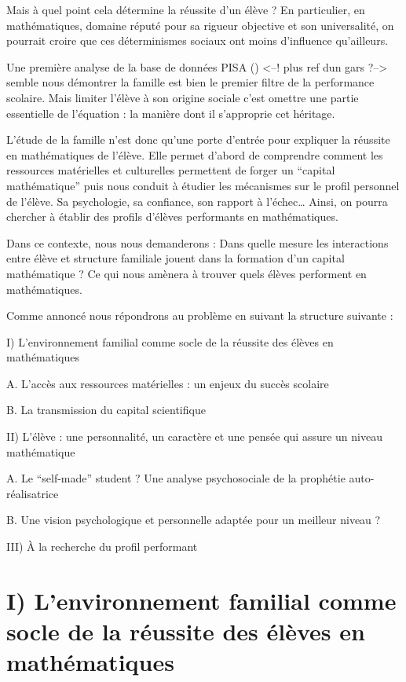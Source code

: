 \documentclass[
  french,
  11pt,
  a4paper,
]{report}
\begin{document}
Mais à quel point cela détermine la réussite d'un élève ? En
particulier, en mathématiques, domaine réputé pour sa rigueur objective
et son universalité, on pourrait croire que ces déterminismes sociaux
ont moins d'influence qu'ailleurs.

Une première analyse de la base de données PISA () \textless--! plus ref
dun gars ?--\textgreater{} semble nous démontrer la famille est bien le
premier filtre de la performance scolaire. Mais limiter l'élève à son
origine sociale c'est omettre une partie essentielle de l'équation : la
manière dont il s'approprie cet héritage.

L'étude de la famille n'est donc qu'une porte d'entrée pour expliquer la
réussite en mathématiques de l'élève. Elle permet d'abord de comprendre
comment les ressources matérielles et culturelles permettent de forger
un ``capital mathématique'' puis nous conduit à étudier les mécanismes
sur le profil personnel de l'élève. Sa psychologie, sa confiance, son
rapport à l'échec\ldots{} Ainsi, on pourra chercher à établir des
profils d'élèves performants en mathématiques.

Dans ce contexte, nous nous demanderons : Dans quelle mesure les
interactions entre élève et structure familiale jouent dans la formation
d'un capital mathématique ? Ce qui nous amènera à trouver quels élèves
performent en mathématiques.

Comme annoncé nous répondrons au problème en suivant la structure
suivante :

I) L'environnement familial comme socle de la réussite des élèves en
mathématiques

A. L'accès aux ressources matérielles : un enjeux du succès scolaire

B. La transmission du capital scientifique

II) L'élève : une personnalité, un caractère et une pensée qui assure un
niveau mathématique

A. Le ``self-made'' student ? Une analyse psychosociale de la prophétie
auto-réalisatrice

B. Une vision psychologique et personnelle adaptée pour un meilleur
niveau ?

III) À la recherche du profil performant

\chapter{I) L'environnement familial comme socle de la réussite des
élèves en
mathématiques}\label{i-lenvironnement-familial-comme-socle-de-la-ruxe9ussite-des-uxe9luxe8ves-en-mathuxe9matiques}
\end{document}

